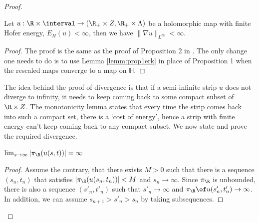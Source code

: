 \begin{proof}
\begin{lemma} \label{lemm:gradbound}
    Let $u : \R\times \interval \to (\R_+ \times Z, \R_+ \times \Lambda)$ be a holomorphic map with finite Hofer energy, $E_H(u) < \infty$, then we have $\|\nabla u \|_{L^\infty} < \infty $. 
\end{lemma}
\begin{proof}
    The proof is the same as the proof of Proposition 2 in \cite{erkaoAsymp}. The only change one needs to do is to use Lemma \ref{lemm:prop1erk} in place of Proposition 1 when the rescaled maps converge to a map on $\mathbb H$. 
\end{proof}




The idea behind the proof of  divergence is that if a semi-infinite strip $u$ does not diverge to infinity, it needs to keep coming back to some compact subset of $\R \times Z$. The monotonicity lemma states that every time the strip comes back into such a compact set, there is a `cost of energy', hence a strip with finite energy can't keep coming back to any compact subset. We now state and prove the required divergence.



\begin{lemma}
\label{lemm:div2inf}
$\lim_{s\to \infty} |\pi_\R (u(s,t)) | = \infty$
\end{lemma}

\begin{proof}


Assume the contrary, that there exists $M > 0$ such that there is a sequence $(s_n,t_n)$ that satisfies $|\pi_\R (u(s_n,t_n)) | < M$ and $s_n \to \infty$. Since $\pi_\R$ is unbounded, there is also a sequence $(s'_n,t'_n)$ such that $s'_n \to \infty$ and $\pi_\R \of u (s'_n,t'_n) \to \infty$. 
In addition, we can assume $s_{n+1} > s'_n > s_n$ by taking subsequences.


\end{proof}
\end{proof}
